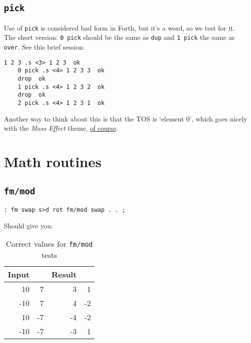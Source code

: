 \subsection{\texttt{pick}}

Use of \texttt{pick} is considered bad form in Forth, but it's a word, so we
test for it. The short version: \texttt{0 pick} should be the same as
\texttt{dup} and \texttt{1 pick} the same as
\texttt{over}. See this brief session:

\begin{lstlisting}[frame=lines]
	1 2 3 .s <3> 1 2 3  ok
	0 pick .s <4> 1 2 3 3  ok
	drop  ok
	1 pick .s <4> 1 2 3 2  ok
	drop  ok
	2 pick .s <4> 1 2 3 1  ok
\end{lstlisting}

\noindent Another way to think about this is that the TOS is `element 0', which
goes nicely with the \textit{Mass Effect} theme, \href{http://masseffect.wikia.com/wiki/Element\_Zero}{of
course}.


\section{Math routines}



\subsection{\texttt{fm/mod}}

\begin{lstlisting}[frame=lines]
        : fm swap s>d rot fm/mod swap . . ; 
\end{lstlisting}

\noindent Should give you: 

\begin{table}[h!]
\centering
\begin{tabular}{ | r r || r r | }
        \hline
	Input & & Result & \\
        \hline
         10 &  7 &  3 &  1\\
        -10 &  7 &  4 & -2 \\
         10 & -7 & -4 & -2\\
        -10 & -7 &  -3 &  1\\
        \hline
\end{tabular}
        \caption{Correct values for \texttt{fm/mod} tests}
        \label{table_fmmod}
\end{table}


